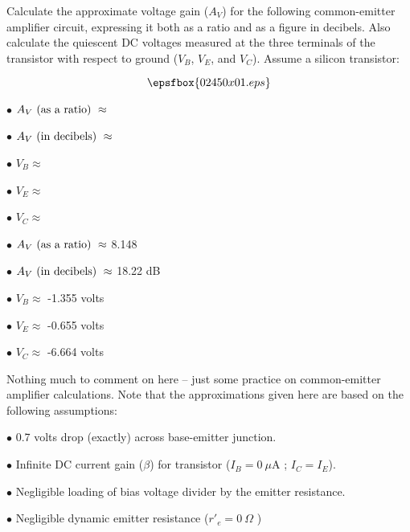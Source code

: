

Calculate the approximate voltage gain ($A_V$) for the following common-emitter amplifier circuit, expressing it both as a ratio and as a figure in decibels.  Also calculate the quiescent DC voltages measured at the three terminals of the transistor with respect to ground ($V_B$, $V_E$, and $V_C$).  Assume a silicon transistor:

$$\epsfbox{02450x01.eps}$$

\medskip
\goodbreak
\item{$\bullet$} $A_V \hbox{ (as a ratio) } \approx$ 
\item{$\bullet$} $A_V \hbox{ (in decibels) } \approx$ 
\item{$\bullet$} $V_B \approx$  
\item{$\bullet$} $V_E \approx$ 
\item{$\bullet$} $V_C \approx$ 
\medskip







\medskip
\goodbreak
\item{$\bullet$} $A_V \hbox{ (as a ratio) } \approx$ 8.148
\item{$\bullet$} $A_V \hbox{ (in decibels) } \approx$ 18.22 dB
\item{$\bullet$} $V_B \approx$ -1.355 volts
\item{$\bullet$} $V_E \approx$ -0.655 volts
\item{$\bullet$} $V_C \approx$ -6.664 volts
\medskip







Nothing much to comment on here -- just some practice on common-emitter amplifier calculations.  Note that the approximations given here are based on the following assumptions:

\medskip
\goodbreak
\item{$\bullet$} 0.7 volts drop (exactly) across base-emitter junction.
\item{$\bullet$} Infinite DC current gain ($\beta$) for transistor ($I_B = 0 \> \mu$A ; $I_C = I_E$).
\item{$\bullet$} Negligible loading of bias voltage divider by the emitter resistance.
\item{$\bullet$} Negligible dynamic emitter resistance ($r'_e = 0 \> \Omega$ )
\medskip

